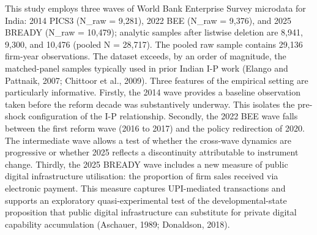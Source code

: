 \documentclass[
  12pt,a4paper]{article}
\begin{document}
This study employs three waves of World Bank Enterprise Survey microdata
for India: 2014 PICS3 (N\_raw = 9,281), 2022 BEE (N\_raw = 9,376), and
2025 BREADY (N\_raw = 10,479); analytic samples after listwise deletion
are 8,941, 9,300, and 10,476 (pooled N = 28,717). The pooled raw sample
contains 29,136 firm-year observations. The dataset exceeds, by an order
of magnitude, the matched-panel samples typically used in prior Indian
I-P work (Elango and Pattnaik, 2007; Chittoor et al., 2009). Three
features of the empirical setting are particularly informative. Firstly,
the 2014 wave provides a baseline observation taken before the reform
decade was substantively underway. This isolates the pre-shock
configuration of the I-P relationship. Secondly, the 2022 BEE wave falls
between the first reform wave (2016 to 2017) and the policy redirection
of 2020. The intermediate wave allows a test of whether the cross-wave
dynamics are progressive or whether 2025 reflects a discontinuity
attributable to instrument change. Thirdly, the 2025 BREADY wave
includes a new measure of public digital infrastructure utilisation: the
proportion of firm sales received via electronic payment. This measure
captures UPI-mediated transactions and supports an exploratory
quasi-experimental test of the developmental-state proposition that
public digital infrastructure can substitute for private digital
capability accumulation (Aschauer, 1989; Donaldson, 2018).
\end{document}
